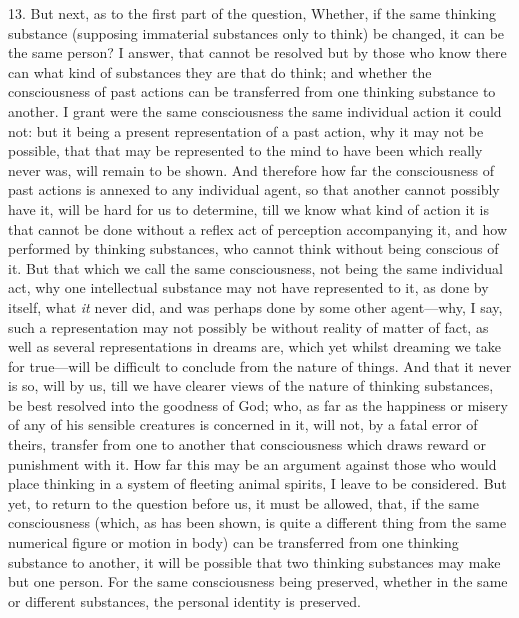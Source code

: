 13. But next, as to the first part of the question, Whether, if the
same thinking substance (supposing immaterial substances only to
think) be changed, it can be the same person? I answer, that cannot be
resolved but by those who know there can what kind of substances they
are that do think; and whether the consciousness of past actions can
be transferred from one thinking substance to another. I grant were
the same consciousness the same individual action it could not: but it
being a present representation of a past action, why it may not be
possible, that that may be represented to the mind to have been which
really never was, will remain to be shown. And therefore how far the
consciousness of past actions is annexed to any individual agent, so
that another  cannot possibly have it, will be hard for us
to determine, till we know what kind of action it is that cannot be
done without a reflex act of perception accompanying it, and how
performed by thinking substances, who cannot think without being
conscious of it. But that which we call the same consciousness, not
being the same individual act, why one intellectual substance may not
have represented to it, as done by itself, what \textit{it} never did,
and was perhaps done by some other a\-gent---why, I say, such a
representation may not possibly be without reality of matter of fact,
as well as several representations in dreams are, which yet whilst
dreaming we take for true---will be difficult to conclude from the
nature of things. And that it never is so, will by us, till we have
clearer views of the nature of thinking substances, be best resolved
into the goodness of God; who, as far as the happiness or misery of
any of his sensible creatures is concerned in it, will not, by a fatal
error of theirs, transfer from one to another that consciousness which
draws reward or punishment with it. How far this may be an argument
against those who would place thinking in a system of fleeting animal
spirits, I leave to be considered. But yet, to return to the question
before us, it must be allowed, that, if the same consciousness (which,
as has been shown, is quite a different thing from the same numerical
figure or motion in body) can be transferred from one thinking
substance to another, it will be possible that two thinking substances
may make but one person. For the same consciousness being preserved,
whether in the same or different substances, the personal identity is
preserved.

